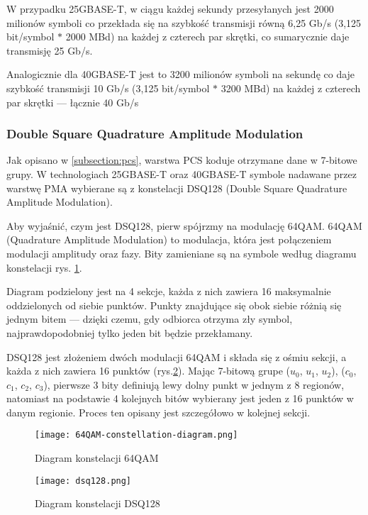 W przypadku 25GBASE-T, w ciągu każdej sekundy przesyłanych jest 2000 milionów symboli co przekłada się na szybkość transmisji
równą 6,25 Gb/s (3,125 bit/symbol $*$ 2000 MBd) na każdej z czterech par skrętki, co sumarycznie daje transmisję 25 Gb/s.

Analogicznie dla 40GBASE-T jest to 3200 milionów symboli na sekundę co daje szybkość transmisji 10 Gb/s (3,125 bit/symbol $*$ 3200 MBd)
na każdej z czterech par skrętki --- łącznie 40 Gb/s

\subsubsection{Double Square Quadrature Amplitude Modulation}
Jak opisano w \ref{subsection:pcs}, warstwa PCS koduje otrzymane dane w 7-bitowe grupy. W technologiach 25GBASE-T oraz 40GBASE-T symbole nadawane przez warstwę PMA wybierane są z konstelacji DSQ128 (Double Square Quadrature Amplitude Modulation).

Aby wyjaśnić, czym jest DSQ128, pierw spójrzmy na modulację 64QAM. 64QAM (Quadrature Amplitude Modulation) to modulacja, która jest połączeniem modulacji amplitudy oraz fazy.
Bity zamieniane są na symbole według diagramu konstelacji rys. \ref{fig:40gbase-t-64QAM}.

Diagram podzielony jest na 4 sekcje, każda z nich zawiera 16 maksymalnie oddzielonych od siebie punktów. Punkty znajdujące się obok siebie różnią się jednym bitem --- dzięki czemu, gdy odbiorca otrzyma zły symbol, najprawdopodobniej tylko jeden bit będzie przekłamany.

DSQ128 jest złożeniem dwóch modulacji 64QAM i składa się z ośmiu sekcji, a każda z nich zawiera 16 punktów (rys.\ref{fig:40gbase-t-dsq128}). Mając 7-bitową grupe ($u_0$, $u_1$, $u_2$), ($c_0$, $c_1$, $c_2$, $c_3$), pierwsze 3 bity definiują lewy dolny punkt w jednym z 8 regionów, natomiast na podstawie 4 kolejnych bitów wybierany jest jeden z 16 punktów w danym regionie.
Proces ten opisany jest szczegółowo w kolejnej sekcji.


\begin{figure}
    \centering
    \texttt{[image: 64QAM-constellation-diagram.png]}
    \caption{Diagram konstelacji 64QAM}
    \label{fig:40gbase-t-64QAM}
\end{figure}

\clearpage

\begin{figure}
    \centering
    \texttt{[image: dsq128.png]}
    \caption{Diagram konstelacji DSQ128}
    \label{fig:40gbase-t-dsq128}
\end{figure}

